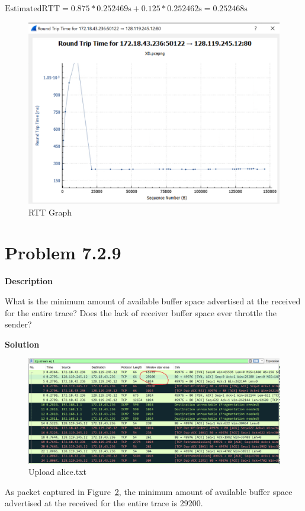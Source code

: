 \documentclass[12pt,letterpaper]{ctexart}
\begin{document}
$\text{EstimatedRTT} = 0.875 * 0.252469\text{s} + 0.125 * 0.252462\text{s} = 0.252468\text{s}$


\begin{figure}[H]
  \centering
  \includegraphics[width=0.7\linewidth]{assets/graph.png}
  \caption{RTT Graph}
  \label{fig:rtt}
\end{figure}

\newpage

\section*{Problem 7.2.9}
{\bf Description}

What is the minimum amount of available buffer space advertised at the received for the entire trace?
Does the lack of receiver buffer space ever throttle the sender?

{\bf Solution}

\begin{figure}[H]
  \centering
  \includegraphics[width=\linewidth]{assets/window.png}
  \caption{Upload alice.txt}
  \label{fig:window}
\end{figure}

As packet captured in Figure~\ref{fig:window}, the minimum amount of available buffer space advertised at the received for the entire trace is 29200.
\end{document}
